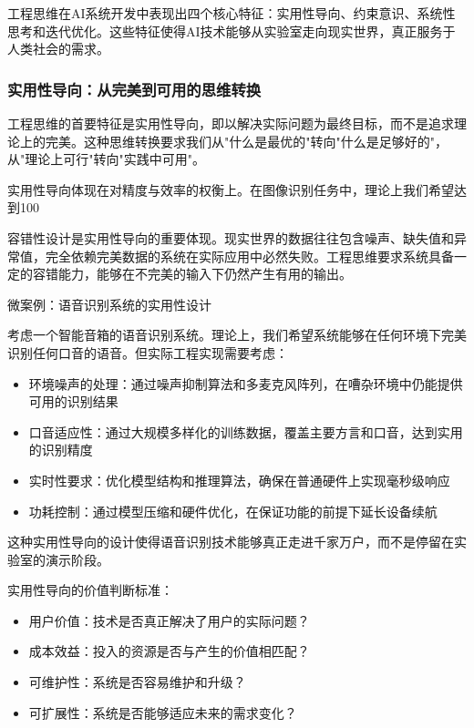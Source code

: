 工程思维在AI系统开发中表现出四个核心特征：实用性导向、约束意识、系统性思考和迭代优化。这些特征使得AI技术能够从实验室走向现实世界，真正服务于人类社会的需求。

\subsubsection{实用性导向：从完美到可用的思维转换}

工程思维的首要特征是实用性导向，即以解决实际问题为最终目标，而不是追求理论上的完美。这种思维转换要求我们从"什么是最优的"转向"什么是足够好的"，从"理论上可行"转向"实践中可用"。

实用性导向体现在对精度与效率的权衡上。在图像识别任务中，理论上我们希望达到100%

容错性设计是实用性导向的重要体现。现实世界的数据往往包含噪声、缺失值和异常值，完全依赖完美数据的系统在实际应用中必然失败。工程思维要求系统具备一定的容错能力，能够在不完美的输入下仍然产生有用的输出。

微案例：语音识别系统的实用性设计

考虑一个智能音箱的语音识别系统。理论上，我们希望系统能够在任何环境下完美识别任何口音的语音。但实际工程实现需要考虑：

\begin{itemize}
\item 环境噪声的处理：通过噪声抑制算法和多麦克风阵列，在嘈杂环境中仍能提供可用的识别结果
\item 口音适应性：通过大规模多样化的训练数据，覆盖主要方言和口音，达到实用的识别精度
\item 实时性要求：优化模型结构和推理算法，确保在普通硬件上实现毫秒级响应
\item 功耗控制：通过模型压缩和硬件优化，在保证功能的前提下延长设备续航
\end{itemize}

这种实用性导向的设计使得语音识别技术能够真正走进千家万户，而不是停留在实验室的演示阶段。

实用性导向的价值判断标准：

\begin{itemize}
\item 用户价值：技术是否真正解决了用户的实际问题？
\item 成本效益：投入的资源是否与产生的价值相匹配？
\item 可维护性：系统是否容易维护和升级？
\item 可扩展性：系统是否能够适应未来的需求变化？
\end{itemize}


